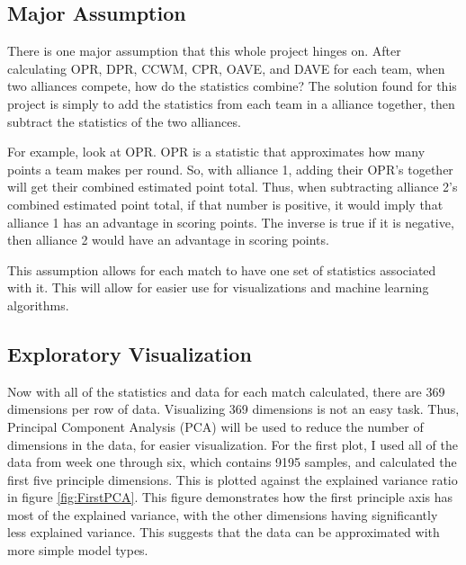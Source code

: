 \documentclass{article}
\begin{document}
\subsection{Major Assumption}
\par
There is one major assumption that this whole project hinges on. After calculating OPR, DPR, CCWM, CPR, OAVE, and DAVE for each team, when two alliances compete, how do the statistics combine? The solution found for this project is simply to add the statistics from each team in a alliance together, then subtract the statistics of the two alliances.
\par
For example, look at OPR. OPR is a statistic that approximates how many points a team makes per round. So, with alliance 1, adding their OPR's together will get their combined estimated point total. Thus, when subtracting alliance 2's combined estimated point total, if that number is positive, it would imply that alliance 1 has an advantage in scoring points. The inverse is true if it is negative, then alliance 2 would have an advantage in scoring points.
\par
This assumption allows for each match to have one set of statistics associated with it. This will allow for easier use for visualizations and machine learning algorithms.

\subsection{Exploratory Visualization} \label{PCA}
\par
Now with all of the statistics and data for each match calculated, there are 369 dimensions per row of data. Visualizing 369 dimensions is not an easy task. Thus, Principal Component Analysis (PCA) will be used to reduce the number of dimensions in the data, for easier visualization. For the first plot, I used all of the data from week one through six, which contains 9195 samples, and calculated the first five principle dimensions. This is plotted against the explained variance ratio in figure \ref{fig:FirstPCA}. This figure demonstrates how the first principle axis has most of the explained variance, with the other dimensions having significantly less explained variance. This suggests that the data can be approximated with more simple model types.
\end{document}
